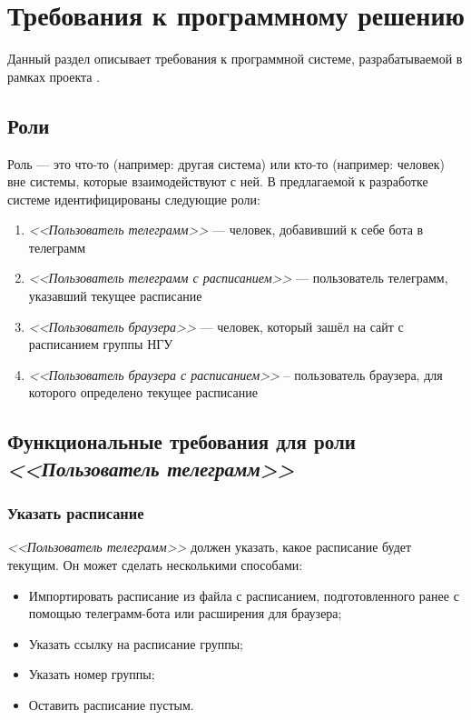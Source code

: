 \newcommand{\actor}[1]{\textit{<<#1>>}}

\chapter{Требования к программному решению}
	\label{chapter3}

	Данный раздел описывает требования к программной системе, разрабатываемой в рамках проекта \ProjectName.
		
	\section{Роли}
		Роль --- это что-то (например: другая система) или кто-то (например: человек) вне системы, которые взаимодействуют с ней. В предлагаемой к разработке системе идентифицированы следующие роли:
		\begin{enumerate}
			\item \actor{Пользователь телеграмм} --- человек, добавивший к себе бота в телеграмм
			
			\item \actor{Пользователь телеграмм с расписанием} --- пользователь телеграмм, указавший текущее расписание
			
			\item \actor{Пользователь браузера} --- человек, который зашёл на сайт с расписанием группы НГУ
			
			\item \actor{Пользователь браузера с расписанием} -- пользователь браузера, для которого определено текущее расписание
		\end{enumerate}
	\section{Функциональные требования для роли \actor{Пользователь телеграмм}}
		\subsection{Указать расписание}
			\actor{Пользователь телеграмм} должен указать, какое расписание будет текущим. Он может сделать несколькими способами:
			\begin{itemize}
				\item Импортировать расписание из файла с расписанием, подготовленного ранее с помощью телеграмм-бота или расширения для браузера;
				
				\item Указать ссылку на расписание группы;
				
				\item Указать номер группы;
				
				\item Оставить расписание пустым.
			\end{itemize}
